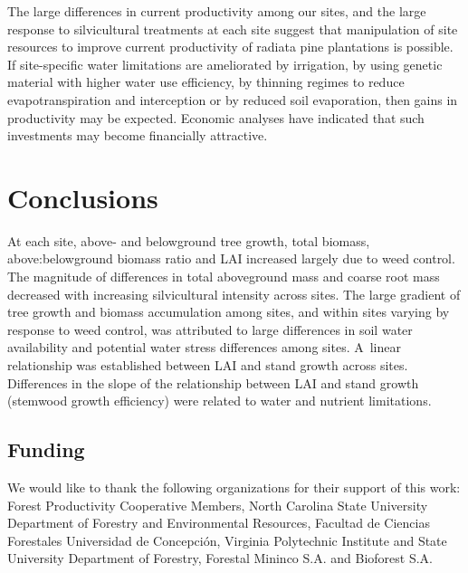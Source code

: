 \documentclass[final]{foresj}
\begin{document}
The large differences in current productivity among our
sites, and the large response to silvicultural treatments
at each site suggest that manipulation of site resources to
improve current productivity of radiata pine plantations is
possible. If site-specific water limitations are
ameliorated by irrigation, by using genetic material with
higher water use efficiency, by thinning regimes to reduce
evapotranspiration and interception\cite{91} or by reduced
soil evaporation, then gains in productivity may be
expected. Economic analyses have indicated that such
investments may become financially attractive.\cite{61}

\section{Conclusions}

At each site, above- and belowground tree growth, total biomass,
above:belowground biomass ratio and LAI increased largely due to weed
control. The magnitude of differences in total aboveground mass and coarse
root mass decreased with increasing silvicultural intensity across sites.
The large gradient of tree growth and biomass accumulation among sites, and
within sites varying by response to weed control, was attributed to large
differences in soil water availability and potential water stress
differences among sites. A~linear relationship was established between LAI
and stand growth across sites. Differences in the slope of the relationship
between LAI and stand growth (stemwood growth efficiency) were related to
water and nutrient limitations.

\subsection{Funding}

We would like to thank the following organizations for their support of this
work: Forest Productivity Cooperative Members, North Carolina State
University Department of Forestry and \hbox{Environmental} Resources, Facultad de
Ciencias Forestales \hbox{Universidad} de Concepci\'{o}n, Virginia Polytechnic
Institute and State University Department of Forestry, Forestal Mininco S.A.
and Bioforest S.A.
\end{document}
